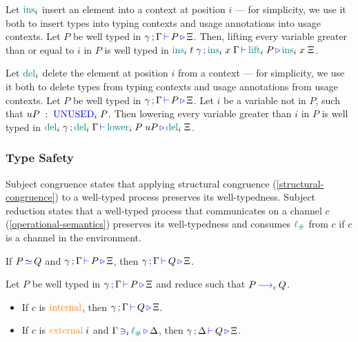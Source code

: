 \documentclass[]{llncs}
\newcommand{\type}[1]{\textcolor{blue}{\operatorname{#1}}}
\newcommand{\constr}[1]{\textcolor{orange}{\operatorname{#1}}}
\newcommand{\func}[1]{\textcolor{teal}{\operatorname{#1}}}
\newcommand{\lio}{\func{\ell_{\#}}}
\newcommand{\reduce}[1]{\, \type{\longrightarrow}_{#1} \,}
\newcommand{\types}[4]{#1 \, \type{;} \, #2 \, \type{\vdash} \, #3 \, \type{\triangleright} \, #4}
\newcommand{\containsusage}[4]{#1 \, \type{\ni}_{#2} \, #3 \, \type{\triangleright} \, #4}
\newcommand{\Unused}{\type{UNUSED}}
\newcommand{\eq}{\, \type{\simeq} \,}
\begin{document}
\begin{nitheorem}[Weakening]
  \label{thm:weakening}
  Let $\func{ins}_i$ insert an element into a context at position $i$ --- for simplicity, we use it both to insert types into typing contexts and usage annotations into usage contexts.
  Let $P$ be well typed in $\types{\gamma}{\Gamma}{P}{\Xi}$.
  Then, lifting every variable greater than or equal to $i$ in $P$ is well typed in
  $\types{\func{ins}_i \; t \; \gamma}{\func{ins}_i \; x \; \Gamma}{\func{lift}_i \; P}{\func{ins}_i \; x \; \Xi}$.
\end{nitheorem}

\begin{nitheorem}[Strengthening]
  \label{thm:strengthening} 
  Let $\func{del}_i$ delete the element at position $i$ from a context --- for simplicity, we use it both to delete types from typing contexts and usage annotations from usage contexts.
  Let $P$ be well typed in $\types{\gamma}{\Gamma}{P}{\Xi}$.
  Let $i$ be a variable not in $P$, such that $uP \; : \; \Unused_i \; P$.
  Then lowering every variable greater than $i$ in $P$ is well typed in $\types{\func{del}_i \; \gamma}{\func{del}_i \; \Gamma}{\func{lower}_i \; P \; uP}{\func{del}_i \; \Xi}$.
\end{nitheorem}

\subsubsection{Type Safety}
Subject congruence states that applying structural congruence (\autoref{structural-congruence}) to a well-typed process preserves its well-typedness.
Subject reduction states that a well-typed process that communicates on a channel $c$ (\autoref{operational-semantics}) preserves its well-typedness and consumes $\lio$ from $c$ if $c$ is a channel in the environment.

\begin{nitheorem}
  \label{thm:subject-congruence}
  If $P \eq{} Q$ and $\types{\gamma}{\Gamma}{P}{\Xi}$, then $\types{\gamma}{\Gamma}{Q}{\Xi}$.
\end{nitheorem}

\begin{nitheorem}
  \label{thm:subject-reduction}
  Let $P$ be well typed in $\types{\gamma}{\Gamma}{P}{\Xi}$ and reduce such that $P \reduce{c} Q$.
  \begin{itemize}
    \item If $c$ is $\constr{internal}$, then $\types{\gamma}{\Gamma}{Q}{\Xi}$.
    \item If $c$ is $\constr{external} \; i$ and $\containsusage{\Gamma}{i}{\lio}{\Delta}$, then $\types{\gamma}{\Delta}{Q}{\Xi}$.
  \end{itemize}
\end{nitheorem}
\end{document}
